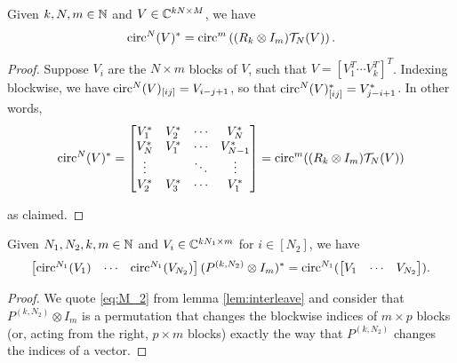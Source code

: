 \begin{lemma}
  Given $k, N, m \in \mathbb{N}$ and $V \in \mathbb{C}^{kN \times M}$, we have \[\operatorname{circ}^N(V)^* = \operatorname{circ}^m\left( (R_k \otimes I_m) \mathcal{T}_N(V) \right).\] \label{lem:circ_transpose}
\end{lemma}

\begin{proof}
  Suppose $V_i$ are the $N \times m$ blocks of $V$, such that $V = \left[V_1^T \cdots V_k^T\right]^T$.  Indexing blockwise, we have $\operatorname{circ}^N(V)_{[ij]} = V_{i - j + 1}$, so that $\operatorname{circ}^N(V)^*_{[ij]} = V_{j - i + 1}^*$.  In other words,
  \[
  \operatorname{circ}^N(V)^* = \begin{bmatrix} V_1^* & V_2^* & \cdots & V_N^* \\ V_N^* & V_1^* & \cdots & V_{N - 1}^* \\ \vdots & & \ddots & \vdots \\ V_2^* & V_3^* & \cdots & V_1^* \end{bmatrix} = \operatorname{circ}^m((R_k \otimes I_m) \mathcal{T}_N(V) )
  \]

  as claimed.
  
\end{proof}

\begin{lemma}
  Given $N_1, N_2, k, m \in \mathbb{N}$ and $V_i \in \mathbb{C}^{k N_1 \times m}$ for $i \in [N_2]$, we have \[\begin{bmatrix} \operatorname{circ}^{N_1}(V_1) & \cdots & \operatorname{circ}^{N_1}(V_{N_2}) \end{bmatrix} (P^{(k, N_2)} \otimes I_m)^* = \operatorname{circ}^{N_1}(\begin{bmatrix} V_1 & \cdots & V_{N_2}\end{bmatrix}).\] \label{lem:block_circ_right}
\end{lemma}

\begin{proof}
  We quote \eqref{eq:M_2} from lemma \ref{lem:interleave} and consider that $P^{(k, N_2)} \otimes I_m$ is a permutation that changes the blockwise indices of $m \times p$ blocks (or, acting from the right, $p \times m$ blocks) exactly the way that $P^{(k, N_2)}$ changes the indices of a vector.
\end{proof}

